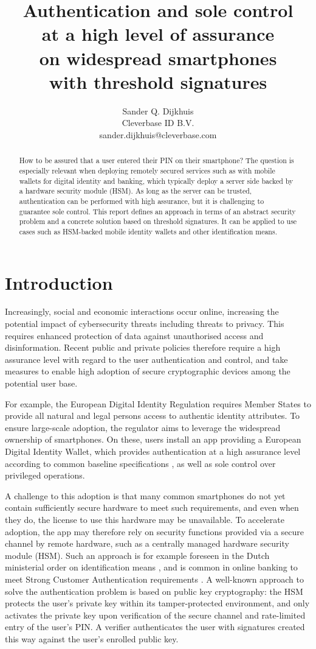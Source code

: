 \documentclass[a4paper]{article}
\author{Sander Q. Dijkhuis\\Cleverbase ID B.V.\\sander.dijkhuis@cleverbase.com}
\title{Authentication and sole control\\at a high level of assurance\\on widespread smartphones\\with threshold signatures}
\begin{document}
\maketitle

\begin{abstract}
How to be assured that a user entered their PIN on their smartphone? The question is especially relevant when deploying remotely secured services such as with mobile wallets for digital identity and banking, which typically deploy a server side backed by a hardware security module (HSM). As long as the server can be trusted, authentication can be performed with high assurance, but it is challenging to guarantee sole control. This report defines an approach in terms of an abstract security problem and a concrete solution based on threshold signatures. It can be applied to use cases such as HSM-backed mobile identity wallets and other identification means.
\end{abstract}

\section{Introduction}

Increasingly, social and economic interactions occur online, increasing the potential impact of cybersecurity threats including threats to privacy. This requires enhanced protection of data against unauthorised access and disinformation. Recent public and private policies therefore require a high assurance level with regard to the user authentication and control, and take measures to enable high adoption of secure cryptographic devices among the potential user base.

For example, the European Digital Identity Regulation \cite{EU2024-1183} requires Member States to provide all natural and legal persons access to authentic identity attributes. To ensure large-scale adoption, the regulator aims to leverage the widespread ownership of smartphones. On these, users install an app providing a European Digital Identity Wallet, which provides authentication at a high assurance level according to common baseline specifications \cite{EU2015-1502}, as well as sole control over privileged operations.

A challenge to this adoption is that many common smartphones do not yet contain sufficiently secure hardware to meet such requirements, and even when they do, the license to use this hardware may be unavailable. To accelerate adoption, the app may therefore rely on security functions provided via a secure channel by remote hardware, such as a centrally managed hardware security module (HSM). Such an approach is for example foreseen in the Dutch ministerial order on identification means \cite{Regeling}, and is common in online banking to meet Strong Customer Authentication requirements \cite{PSD2}. A well-known approach to solve the authentication problem is based on public key cryptography: the HSM protects the user’s private key within its tamper-protected environment, and only activates the private key upon verification of the secure channel and rate-limited entry of the user’s PIN. A verifier authenticates the user with signatures created this way against the user’s enrolled public key.
\end{document}
